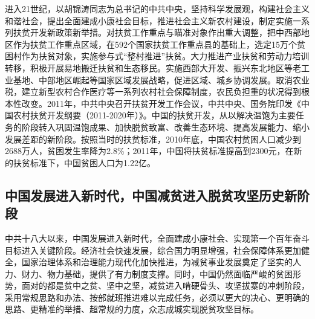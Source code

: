 \documentclass{ctexart}
\begin{document}
进入21世纪，以胡锦涛同志为总书记的中共中央，坚持科学发展观，构建社会主义和谐社会，提出全面建成小康社会目标，推进社会主义新农村建设，制定实施一系列扶贫开发新政策新举措。对扶贫工作重点与瞄准对象作出重大调整，把中西部地区作为扶贫工作重点区域，在592个国家扶贫工作重点县的基础上，选定15万个贫困村作为扶贫对象，实施参与式“整村推进”扶贫。大力推进产业扶贫和劳动力培训转移，积极开展易地搬迁扶贫和生态移民。实施西部大开发、振兴东北地区等老工业基地、中部地区崛起等国家区域发展战略，促进区域、城乡协调发展。取消农业税，建立新型农村合作医疗等一系列农村社会保障制度，农民负担重的状况得到根本性改变。2011年，中共中央召开扶贫开发工作会议，中共中央、国务院印发《中国农村扶贫开发纲要（2011-2020年）》。中国的扶贫开发，从以解决温饱为主要任务的阶段转入巩固温饱成果、加快脱贫致富、改善生态环境、提高发展能力、缩小发展差距的新阶段。按照当时的扶贫标准，2010年底，中国农村贫困人口减少到2688万人，贫困发生率降为2.8\%；2011年，中国将扶贫标准提高到2300元，在新的扶贫标准下，中国贫困人口为1.22亿。

\subsection{中国发展进入新时代，中国减贫进入脱贫攻坚历史新阶段}

中共十八大以来，中国发展进入新时代，全面建成小康社会、实现第一个百年奋斗目标进入关键阶段。经济社会快速发展，综合国力明显增强，社会保障体系更加健全，国家治理体系和治理能力现代化加快推进，为减贫事业发展奠定了坚实的人力、财力、物力基础，提供了有力制度支撑。同时，中国仍然面临严峻的贫困形势，面对的都是贫中之贫、坚中之坚，减贫进入啃硬骨头、攻坚拔寨的冲刺阶段，采用常规思路和办法、按部就班推进难以完成任务，必须以更大的决心、更明确的思路、更精准的举措、超常规的力度，众志成城实现脱贫攻坚目标。
\end{document}
